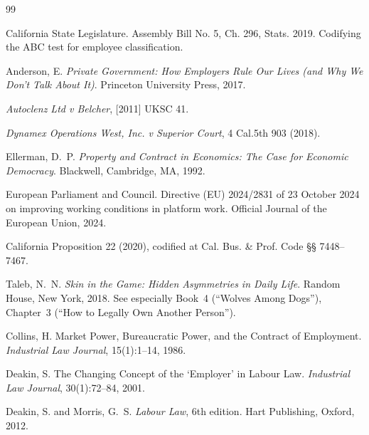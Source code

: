 \documentclass[11pt,a4paper]{article}
\theoremstyle{remark}
\begin{document}

\begin{thebibliography}{99}

California State Legislature.
\newblock Assembly Bill No. 5, Ch. 296, Stats. 2019.
\newblock Codifying the ABC test for employee classification.

Anderson, E.
\newblock \emph{Private Government: How Employers Rule Our Lives
  (and Why We Don't Talk About It)}.
\newblock Princeton University Press, 2017.

\emph{Autoclenz Ltd v Belcher}, [2011] UKSC 41.

\emph{Dynamex Operations West, Inc. v Superior Court},
  4 Cal.5th 903 (2018).

Ellerman, D.~P.
\newblock \emph{Property and Contract in Economics: The Case for
  Economic Democracy}.
\newblock Blackwell, Cambridge, MA, 1992.

European Parliament and Council.
\newblock Directive (EU) 2024/2831 of 23 October 2024 on improving
  working conditions in platform work.
\newblock Official Journal of the European Union, 2024.

California Proposition 22 (2020), codified at Cal. Bus. \&
  Prof. Code §§ 7448--7467.

Taleb, N.~N.
\newblock \emph{Skin in the Game: Hidden Asymmetries in Daily Life}.
\newblock Random House, New York, 2018.
\newblock See especially Book~4 (``Wolves Among Dogs''), Chapter~3
  (``How to Legally Own Another Person'').

Collins, H.
\newblock Market Power, Bureaucratic Power, and the Contract of
  Employment.
\newblock \emph{Industrial Law Journal}, 15(1):1--14, 1986.

Deakin, S.
\newblock The Changing Concept of the `Employer' in Labour Law.
\newblock \emph{Industrial Law Journal}, 30(1):72--84, 2001.

Deakin, S. and Morris, G.~S.
\newblock \emph{Labour Law}, 6th edition.
\newblock Hart Publishing, Oxford, 2012.


\end{thebibliography}
\end{document}
